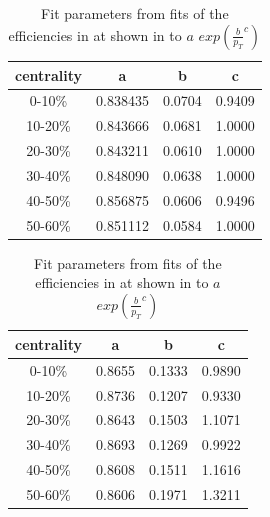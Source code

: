 % 
\begin{table}
\begin{center}
\caption[Paramters from efficiency fits in \Cu \sNNsixtytwo]{Fit parameters from fits of the efficiencies in \Au at \sNNsixtytwo shown in  to $a$  $exp(\frac{b}{p_T}^c)$}\label{CuCu62EfficiencyFitTable}
\begin{tabular}{c|c c c}
\hline
centrality & a & b & c \\ \hline
0-10\% & 0.838435  & 0.0704 & 0.9409\\
10-20\% & 0.843666 & 0.0681 & 1.0000\\
20-30\% & 0.843211 & 0.0610 & 1.0000\\
30-40\% & 0.848090 & 0.0638 & 1.0000\\
40-50\% & 0.856875 & 0.0606 & 0.9496\\
50-60\% & 0.851112 & 0.0584 & 1.0000\\ \hline
\end{tabular}
\end{center}
\end{table}

\begin{table}
\begin{center}
\caption[Paramters from efficiency fits in \Cu \sNNtwohundred]{Fit parameters from fits of the efficiencies in \Cu at \sNNsixtytwo shown in  to $a$  $exp(\frac{b}{p_T}^c)$}\label{CuCu200EfficiencyFitTable}
\begin{tabular}{c|c c c}
\hline
centrality & a & b & c \\ \hline
0-10\%  & 0.8655 & 0.1333 & 0.9890\\
10-20\% & 0.8736 & 0.1207 & 0.9330\\
20-30\% & 0.8643 & 0.1503 & 1.1071\\
30-40\% & 0.8693 & 0.1269 & 0.9922\\
40-50\% & 0.8608 & 0.1511 & 1.1616\\
50-60\% & 0.8606 & 0.1971 & 1.3211\\ \hline
\end{tabular}
\end{center}
\end{table}

